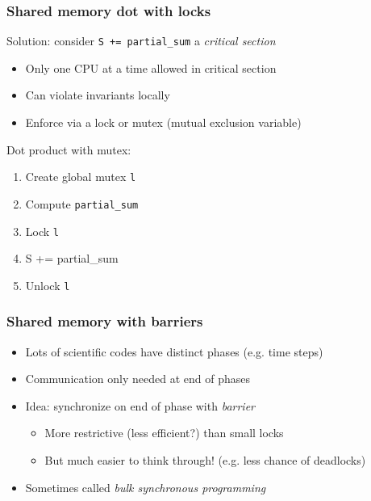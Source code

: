 \documentclass{beamer}
\begin{document}
\begin{frame}
  \frametitle{Shared memory dot with locks}

  Solution: consider {\tt S += partial\_sum} a {\em critical section}
  \begin{itemize}
  \item Only one CPU at a time allowed in critical section
  \item Can violate invariants locally
  \item Enforce via a lock or mutex (mutual exclusion variable)
  \end{itemize}
  
  \vspace{5mm}
  Dot product with mutex:
  \begin{enumerate}
  \item Create global mutex {\tt l}
  \item Compute {\tt partial\_sum}
  \item Lock {\tt l}
  \item {S += partial\_sum}
  \item Unlock {\tt l}
  \end{enumerate}

\end{frame}


\begin{frame}
  \frametitle{Shared memory with barriers}
  
  \begin{itemize}
  \item Lots of scientific codes have distinct phases (e.g. time steps)
  \item Communication only needed at end of phases
  \item Idea: synchronize on end of phase with {\em barrier}
    \begin{itemize}
    \item More restrictive (less efficient?) than small locks
    \item But much easier to think through!  (e.g. less chance of deadlocks)
    \end{itemize}
  \item Sometimes called {\em bulk synchronous programming}
  \end{itemize}

\end{frame}
\end{document}
